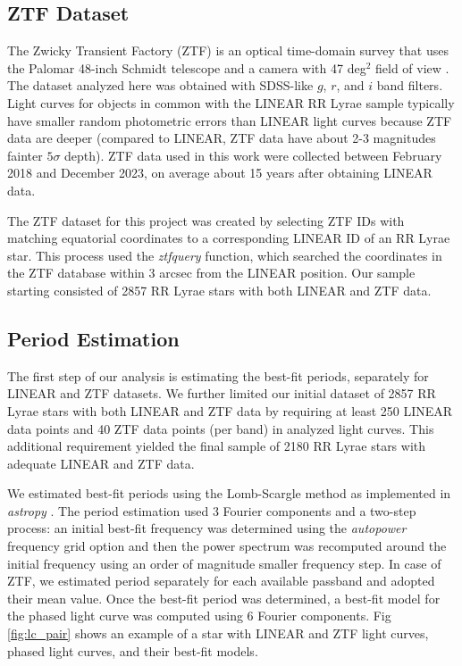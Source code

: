 \subsection{ZTF Dataset}

The Zwicky Transient Factory (ZTF) is an optical time-domain survey that uses the Palomar 48-inch Schmidt telescope
and a camera with 47 deg$^2$ field of view \citep{2019PASP..131a8002B}. The dataset analyzed here was obtained with
SDSS-like $g$, $r$, and $i$ band filters. Light curves for objects in common with the LINEAR RR Lyrae sample typically
have smaller random photometric errors than LINEAR light curves because ZTF data are deeper (compared to LINEAR,
ZTF data have about 2-3 magnitudes fainter  $5\sigma$ depth). ZTF data used in this work were collected between
February 2018 and December 2023, on average about 15 years after obtaining LINEAR data. 

The ZTF dataset for this project was created by selecting ZTF IDs with matching equatorial coordinates to a corresponding
LINEAR ID of an RR Lyrae star. This process used the {\it ztfquery} function, which searched the coordinates in the ZTF database
within 3 arcsec from the LINEAR position. Our sample starting consisted of 2857 RR Lyrae stars with both LINEAR and ZTF data. 


\subsection{Period Estimation}

The first step of our analysis is estimating the best-fit periods, separately for LINEAR and ZTF datasets. We further
limited our initial dataset of 2857 RR Lyrae stars with both LINEAR and ZTF data by requiring at least 250 LINEAR
data points and 40 ZTF data points (per band) in analyzed light curves. This additional requirement yielded the final sample
of 2180 RR Lyrae stars with adequate LINEAR and ZTF data. 

We estimated best-fit periods using the Lomb-Scargle method \citep{2015zndo.....14833V} as implemented in {\it astropy}
\citep{2018AJ....156..123A}. The period estimation used 3 Fourier components and a two-step process: an initial
best-fit frequency was determined using the {\it autopower} frequency grid option and then the power spectrum was
recomputed around the initial frequency using an order of magnitude smaller frequency step. In case of ZTF, we
estimated period separately for each available passband and adopted their mean value. Once the best-fit
period was determined, a best-fit model for the phased light curve was computed using 6 Fourier components.
Fig \ref{fig:lc_pair} shows an example of a star with LINEAR and ZTF light curves, phased light curves, and their
best-fit models.  

